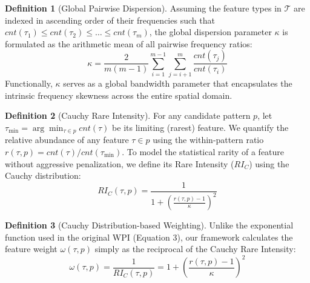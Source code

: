 \documentclass[12pt, letterpaper]{template}
\theoremstyle{definition}
\newtheorem{definition}{Definition}
\begin{document}
\begin{definition}[Global Pairwise Dispersion]
Assuming the feature types in $\mathcal{T}$ are indexed in ascending order of their frequencies such that ${cnt}(\tau_1) \le {cnt}(\tau_2) \le \ldots \le {cnt}(\tau_m)$, the global dispersion parameter $\kappa$ is formulated as the arithmetic mean of all pairwise frequency ratios:
\begin{equation}
\label{eq:kappa}
\kappa = \frac{2}{m(m-1)} \sum_{i=1}^{m-1} \sum_{j=i+1}^{m} \frac{{cnt}(\tau_j)}{{cnt}(\tau_i)}
\end{equation}
Functionally, $\kappa$ serves as a global bandwidth parameter that encapsulates the intrinsic frequency skewness across the entire spatial domain.
\end{definition}

\begin{definition}[Cauchy Rare Intensity]
For any candidate pattern $p$, let $\tau_{\min} = \arg\min_{\tau\in p}{cnt}(\tau)$ be its limiting (rarest) feature. We quantify the relative abundance of any feature $\tau \in p$ using the within-pattern ratio $r(\tau,p) = {cnt}(\tau) / {cnt}(\tau_{\min})$. To model the statistical rarity of a feature without aggressive penalization, we define its Rare Intensity (${RI}_{{C}}$) using the Cauchy distribution:
\begin{equation}
RI_C(\tau, p) = \frac{1}{1 + \left(\frac{r(\tau,p)-1}{\kappa}\right)^2}
\end{equation}
\end{definition}

\begin{definition}[Cauchy Distribution-based Weighting]
Unlike the exponential function used in the original WPI (Equation 3), our framework calculates the feature weight $\omega(\tau,p)$ simply as the reciprocal of the Cauchy Rare Intensity:
\begin{equation}
\omega(\tau,p) = \frac{1}{{RI}_{{C}}(\tau, p)} = 1 + \left(\frac{r(\tau,p)-1}{\kappa}\right)^2
\end{equation}
\end{definition}
\end{document}

